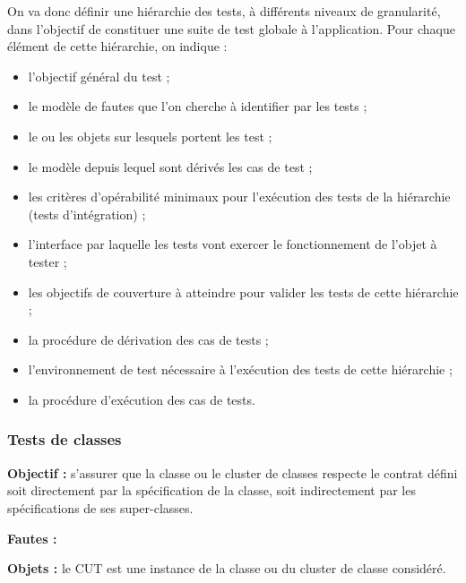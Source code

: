 \par
  
    On va donc d\'efinir une hi\'erarchie des tests, \`a
    diff\'erents niveaux de granularit\'e, dans l'objectif de
    constituer une suite de test globale \`a l'application. Pour
    chaque \'el\'ement de cette hi\'erarchie, on indique :
    
\begin{itemize}
       
\item l'objectif g\'en\'eral du test ; 
\item le mod\`ele de fautes que l'on cherche \`a identifier par
     les tests ; 
\item le ou les objets sur lesquels portent les test ; 
\item le mod\`ele depuis lequel sont d\'eriv\'es les cas de
     test ; 
\item les crit\`eres d'op\'erabilit\'e minimaux pour
     l'ex\'ecution des tests de la hi\'erarchie (tests
     d'int\'egration) ; 
\item l'interface par laquelle les tests vont exercer le
     fonctionnement de l'objet \`a tester ; 
\item les objectifs de couverture \`a atteindre pour valider les
     tests de cette hi\'erarchie ; 
\item la proc\'edure de d\'erivation des cas de tests ; 
\item l'environnement de test n\'ecessaire \`a l'ex\'ecution
     des tests de cette hi\'erarchie ; 
\item la proc\'edure d'ex\'ecution des cas de tests.
\end{itemize}
  
\par
  
\subsubsection{Tests de classes}
  
\textbf{Objectif :}
  s'assurer que la classe ou le cluster de
    classes respecte le contrat d\'efini soit directement par la
    sp\'ecification de la classe, soit indirectement par les
    sp\'ecifications de ses super-classes.
\par
  
\textbf{Fautes :}
  
\par
  
\textbf{Objets :}
   le CUT est une instance de la classe ou du
    cluster de classe consid\'er\'e.
\par
  
